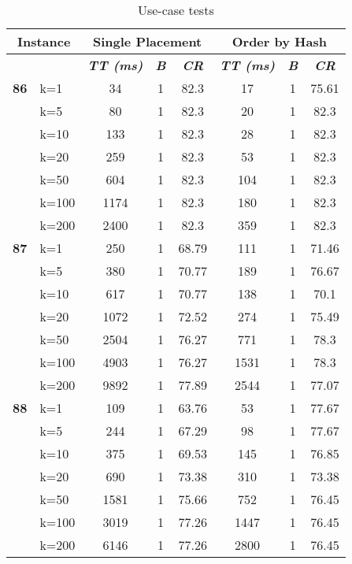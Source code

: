     \begin{table}[htbp]
    \caption{Use-case tests}
    \centering
    \begin{tabular}{|l|l|c|c|c|c|c|c|}
    
    \multicolumn{ 2}{|c|}{\textbf{Instance}} & \multicolumn{ 3}{c|}{\textbf{Single Placement}} & \multicolumn{ 3}{c|}{\textbf{Order by Hash}} \\ \hline
    \multicolumn{ 2}{|l|}{} & \textbf{\textit{TT (ms)}} & \textbf{\textit{B}} & \textbf{\textit{CR}} & \textbf{\textit{TT (ms)}} & \textbf{\textit{B}} & \textbf{\textit{CR}} \\ \hline
    \multicolumn{1}{|r|}{\textbf{86}} & k=1 & 34 & 1 & 82.3 & 17 & 1 & 75.61 \\ 
     & k=5 & 80 & 1 & 82.3 & 20 & 1 & 82.3 \\ 
     & k=10 & 133 & 1 & 82.3 & 28 & 1 & 82.3 \\ 
     & k=20 & 259 & 1 & 82.3 & 53 & 1 & 82.3 \\ 
     & k=50 & 604 & 1 & 82.3 & 104 & 1 & 82.3 \\ 
     & k=100 & 1174 & 1 & 82.3 & 180 & 1 & 82.3 \\ 
     & k=200 & 2400 & 1 & 82.3 & 359 & 1 & 82.3 \\ \hline
    \multicolumn{1}{|r|}{\textbf{87}} & k=1 & 250 & 1 & 68.79 & 111 & 1 & 71.46 \\ 
     & k=5 & 380 & 1 & 70.77 & 189 & 1 & 76.67 \\ 
     & k=10 & 617 & 1 & 70.77 & 138 & 1 & 70.1 \\ 
     & k=20 & 1072 & 1 & 72.52 & 274 & 1 & 75.49 \\ 
     & k=50 & 2504 & 1 & 76.27 & 771 & 1 & 78.3 \\ 
     & k=100 & 4903 & 1 & 76.27 & 1531 & 1 & 78.3 \\ 
     & k=200 & 9892 & 1 & 77.89 & 2544 & 1 & 77.07 \\ \hline
    \multicolumn{1}{|r|}{\textbf{88}} & k=1 & 109 & 1 & 63.76 & 53 & 1 & 77.67 \\ 
     & k=5 & 244 & 1 & 67.29 & 98 & 1 & 77.67 \\ 
     & k=10 & 375 & 1 & 69.53 & 145 & 1 & 76.85 \\ 
     & k=20 & 690 & 1 & 73.38 & 310 & 1 & 73.38 \\ 
     & k=50 & 1581 & 1 & 75.66 & 752 & 1 & 76.45 \\ 
     & k=100 & 3019 & 1 & 77.26 & 1447 & 1 & 76.45 \\ 
     & k=200 & 6146 & 1 & 77.26 & 2800 & 1 & 76.45 \\ \hline

\end{tabular}
\end{table}
